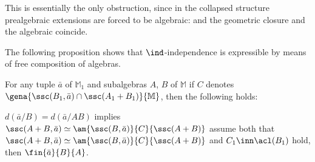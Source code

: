 This is essentially the only obstruction, since in the collapsed structure
prealgebraic extensions are forced to be algebraic: and the geometric closure and the algebraic coincide.

\medskip
The following proposition shows that $\ind$-independence is expressible by means
of free composition of algebras.
\begin{prop}\label{forkingchar}
For any tuple $\bar a$ of $\mathbb{M}_{1}$ and subalgebras $A$, $B$ of $\mathbb{M}$ if $C$ denotes
$\gena{\ssc(B_{1},\bar a)\cap\ssc(A_{1}+B_{1})}{\mathbb{M}}$, then the following holds:
\begin{itemize}
$d(\bar a/B)=d(\bar a/AB)$ implies $\ssc(A+B,\bar a)\simeq\am{\ssc(B,\bar a)}{C}{\ssc(A+B)}$
assume both that $\ssc(A+B,\bar a)\simeq\am{\ssc(B,\bar a)}{C}{\ssc(A+B)}$ and
$C_{1}\inn\acl(B_{1})$ hold, then $\fin{\bar a}{B}{A}$.
\end{itemize}
\end{prop}
